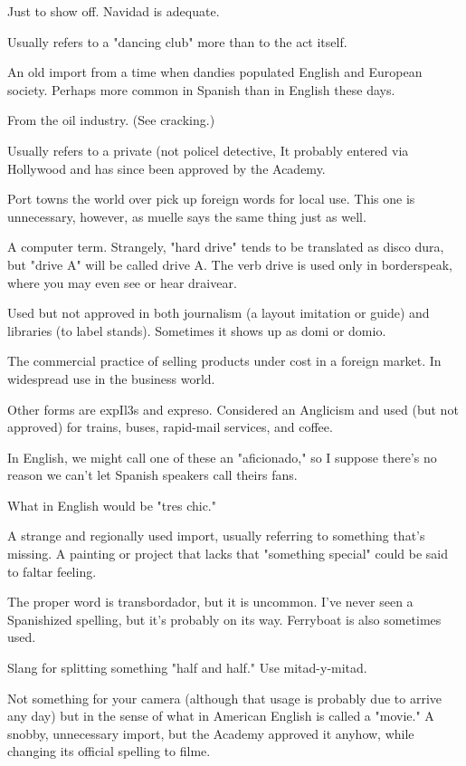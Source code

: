  Just to show off. Navidad is adequate.

 Usually refers to a "dancing club" more than to
the act itself.

 An old import from a time when dandies populated
English and European society. Perhaps more common in Spanish than
in English these days.

 From the oil industry. (See cracking.)

 Usually refers to a private (not policel detective,
It probably entered via Hollywood and has since been approved by the
Academy.

 Port towns the world over pick up foreign words for local use. This one is unnecessary, however, as muelle says the same
thing just as well.

 A computer term. Strangely, "hard drive" tends to be
translated as disco dura, but "drive A" will be called drive A. The
verb drive is used only in borderspeak, where you may even see or hear
draivear.

 Used but not approved in both journalism (a layout
imitation or guide) and libraries (to label stands). Sometimes it shows
up as domi or domio.

 The commercial practice of selling products under
cost in a foreign market. In widespread use in the business world.

 Other forms are expIl3s and expreso. Considered an
Anglicism and used (but not approved) for trains, buses, rapid-mail services, and coffee.

 In English, we might call one of these an "aficionado,"
so I suppose there's no reason we can't let Spanish speakers call
theirs fans.

 What in English would be "tres chic."

 A strange and regionally used import, usually referring to something that's missing. A painting or project that lacks that
"something special" could be said to faltar feeling.

 The proper word is transbordador, but it is uncommon. I've never seen a Spanishized spelling, but it's probably on its
way. Ferryboat is also sometimes used.

 Slang for splitting something "half and half."
Use mitad-y-mitad.

 Not something for your camera (although that usage is
probably due to arrive any day) but in the sense of what in American
English is called a "movie." A snobby, unnecessary import, but the
Academy approved it anyhow, while changing its official spelling to
filme.

